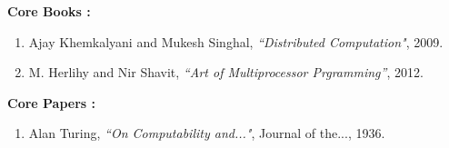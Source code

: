 \documentclass[10pt]{article}
\begin{document}
\vspace{0.35 in}
{\Large \textbf{Core Books :}}
\vspace{0.2 in}
\begin{enumerate}
\item Ajay Khemkalyani and Mukesh Singhal, \textit{``Distributed Computation"},  2009.
\item M. Herlihy and Nir Shavit, \textit{``Art of Multiprocessor Prgramming''}, 2012.
\end{enumerate}

\vspace{0.35 in}
{\Large \textbf{Core Papers :}}
\vspace{0.2 in}
\begin{enumerate}

\item Alan Turing,  \textit{``On Computability and..."}, Journal of the..., 1936.

\end{enumerate}
\end{document}
